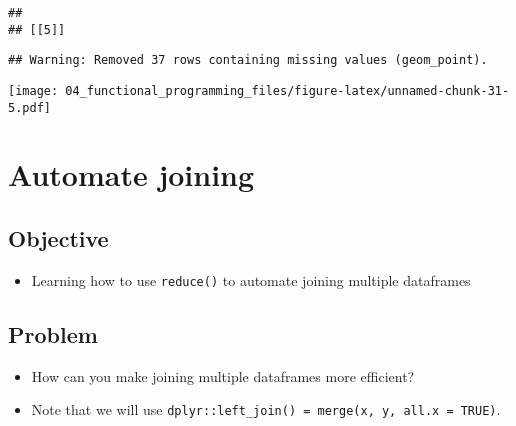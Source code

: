 \documentclass[
]{book}
\providecommand{\tightlist}{%
  \setlength{\itemsep}{0pt}\setlength{\parskip}{0pt}}
\begin{document}
\begin{verbatim}
## 
## [[5]]
\end{verbatim}

\begin{verbatim}
## Warning: Removed 37 rows containing missing values (geom_point).
\end{verbatim}

\texttt{[image: 04\_functional\_programming\_files/figure-latex/unnamed-chunk-31-5.pdf]}

\hypertarget{automate-joining}{%
\section{Automate joining}\label{automate-joining}}

\hypertarget{objective-1}{%
\subsection{Objective}\label{objective-1}}

\begin{itemize}
\tightlist
\item
  Learning how to use \texttt{reduce()} to automate joining multiple dataframes
\end{itemize}

\hypertarget{problem-2}{%
\subsection{Problem}\label{problem-2}}

\begin{itemize}
\item
  How can you make joining multiple dataframes more efficient?
\item
  Note that we will use \texttt{dplyr::left\_join()\ =\ merge(x,\ y,\ all.x\ =\ TRUE)}.
\end{itemize}
\end{document}

